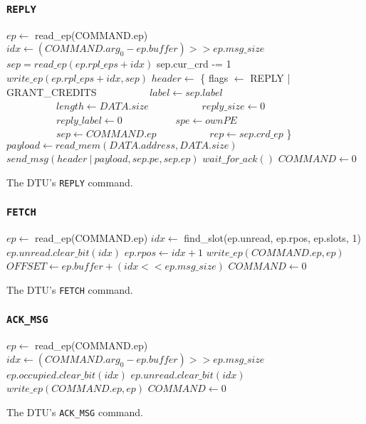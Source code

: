 \documentclass[a4paper,11pt,draft]{article}
\begin{document}
\subsubsection{\texttt{REPLY}}

\begin{algorithm}[H]
    $ep \gets$ read\_ep(COMMAND.ep)\;
    \BlankLine
    $idx \gets (COMMAND.arg_0 - ep.buffer) >> ep.msg\_size$\;
    $sep = read\_ep(ep.rpl\_eps + idx)$\;
    \BlankLine
    sep.cur\_crd -= 1\;
    $write\_ep(ep.rpl\_eps + idx, sep)$\;
    \BlankLine
    $header \gets$ \{ flags $\gets$ REPLY | GRANT\_CREDITS\;
    $\quad\quad\quad\quad\quad label \gets sep.label$\;
    $\quad\quad\quad\quad\quad length \gets DATA.size$\;
    $\quad\quad\quad\quad\quad reply\_size \gets 0$\;
    $\quad\quad\quad\quad\quad reply\_label \gets 0$\;
    $\quad\quad\quad\quad\quad spe \gets ownPE$\;
    $\quad\quad\quad\quad\quad sep \gets COMMAND.ep$\;
    $\quad\quad\quad\quad\quad rep \gets sep.crd\_ep$ \}\;
    $payload \gets read\_mem(DATA.address, DATA.size)$\;
    $send\_msg(header\ |\ payload, sep.pe, sep.ep)$\;
    $wait\_for\_ack()$\;
    \BlankLine
    $COMMAND \gets 0$\;
    \caption{The DTU's \texttt{REPLY} command.}
\end{algorithm}

\subsubsection{\texttt{FETCH}}

\begin{algorithm}[H]
    $ep \gets$ read\_ep(COMMAND.ep)\;
    \BlankLine
    $idx \gets$ find\_slot(ep.unread, ep.rpos, ep.slots, 1)\;
    $ep.unread.clear\_bit(idx)$\;
    $ep.rpos \gets idx + 1$\;
    $write\_ep(COMMAND.ep, ep)$\;
    \BlankLine
    $OFFSET \gets ep.buffer + (idx << ep.msg\_size)$\;
    $COMMAND \gets 0$\;
    \caption{The DTU's \texttt{FETCH} command.}
\end{algorithm}

\subsubsection{\texttt{ACK\_MSG}}

\begin{algorithm}[H]
    $ep \gets$ read\_ep(COMMAND.ep)\;
    \BlankLine
    $idx \gets (COMMAND.arg_0 - ep.buffer) >> ep.msg\_size$\;
    $ep.occupied.clear\_bit(idx)$\;
    $ep.unread.clear\_bit(idx)$\;
    $write\_ep(COMMAND.ep, ep)$\;
    \BlankLine
    \BlankLine
    $COMMAND \gets 0$\;
    \caption{The DTU's \texttt{ACK\_MSG} command.}
\end{algorithm}
\end{document}

